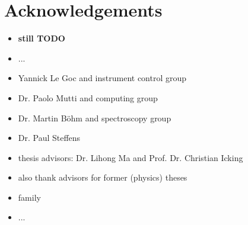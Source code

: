 %
%

\chapter*{Acknowledgements}

\begin{itemize}
	\item {\bf still TODO}
	\item ...
	\item Yannick Le Goc and instrument control group
	\item Dr. Paolo Mutti and computing group
	\item Dr. Martin B\"ohm and spectroscopy group
	\item Dr. Paul Steffens
	\item thesis advisors: Dr. Lihong Ma and Prof. Dr. Christian Icking
	\item also thank advisors for former (physics) theses
	\item family
	\item ...
\end{itemize}

